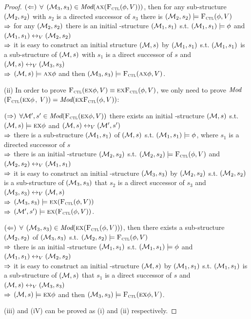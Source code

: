 \documentclass{article}
\begin{document}
\begin{proof}
$(\Leftarrow)$ $\forall$ $({\cal M}_3, s_3) \in \textit{Mod}(\textsc{a} \textsc{x} ({\textsc{F}_{\textsc{ctl}}}(\phi,V)))$, then for any sub-structure $({\cal M}_2, s_2)$ with $s_2$ is a directed successor of $s_3$ there is $({\cal M}_2, s_2) \models {\textsc{F}_{\textsc{ctl}}}(\phi,V)$\\
$\Rightarrow$ for any $({\cal M}_2, s_2)$ there is an initial \MPK-structure $({\cal M}_1, s_1)$ s.t. $({\cal M}_1, s_1) \models \phi$ and $({\cal M}_1, s_1) \leftrightarrow_V ({\cal M}_2, s_2)$\\
$\Rightarrow$ it is easy to construct an initial structure $({\cal M},s)$ by $({\cal M}_1, s_1)$ s.t. $({\cal M}_1, s_1)$ is a sub-structure of $({\cal M}, s)$ with $s_1$ is a direct successor of $s$ and $({\cal M}, s)\leftrightarrow_V ({\cal M}_3, s_3)$\\
$\Rightarrow$ $({\cal M}, s) \models \textsc{a} \textsc{x} \phi$ and then $({\cal M}_3, s_3) \models {\textsc{F}_{\textsc{ctl}}}(\textsc{a} \textsc{x} \phi, V)$.


(ii) In order to prove ${\textsc{F}_{\textsc{ctl}}}(\textsc{e} \textsc{x} \phi, V) \equiv \textsc{e}\textsc{x}{\textsc{F}_{\textsc{ctl}}}(\phi, V)$, we only need to prove $\textit{Mod}$ $({\textsc{F}_{\textsc{ctl}}}(\textsc{e} \textsc{x} \phi$, $V)) = \textit{Mod}( \textsc{e}\textsc{x}{\textsc{F}_{\textsc{ctl}}}(\phi, V))$:

$(\Rightarrow)$ $\forall {\cal M}', s' \in \textit{Mod}({\textsc{F}_{\textsc{ctl}}}(\textsc{e} \textsc{x} \phi, V))$ there exists an initial \MPK-structure $({\cal M}, s)$ s.t. $({\cal M}, s) \models \textsc{e} \textsc{x} \phi$ and $({\cal M}, s) \leftrightarrow_V ({\cal M}',s')$\\
$\Rightarrow$ there is a sub-structure $({\cal M}_1, s_1)$ of $({\cal M}, s)$ s.t. $({\cal M}_1, s_1) \models \phi$, where $s_1$ is a directed successor of $s$\\
$\Rightarrow$ there is an initial \MPK-structure $({\cal M}_2, s_2)$ s.t. $({\cal M}_2, s_2) \models {\textsc{F}_{\textsc{ctl}}}(\phi,V)$ and $({\cal M}_2, s_2) \leftrightarrow_V ({\cal M}_1,s_1)$\\
$\Rightarrow$ it is easy to construct an initial \MPK-structure $({\cal M}_3, s_3)$ by $({\cal M}_2, s_2)$ s.t. $({\cal M}_2, s_2)$ is a sub-structure of $({\cal M}_3, s_3)$ that $s_2$ is a direct successor of $s_3$ and $({\cal M}_3, s_3) \leftrightarrow_V ({\cal M},s)$\\
$\Rightarrow$ $({\cal M}_3, s_3) \models \textsc{e} \textsc{x} ({\textsc{F}_{\textsc{ctl}}}(\phi,V))$\\
$\Rightarrow$ $({\cal M}', s') \models \textsc{e} \textsc{x} ({\textsc{F}_{\textsc{ctl}}}(\phi,V))$.

$(\Leftarrow)$ $\forall$ $({\cal M}_3, s_3) \in \textit{Mod}(\textsc{e} \textsc{x} ({\textsc{F}_{\textsc{ctl}}}(\phi,V)))$, then there exists a sub-structure $({\cal M}_2, s_2)$ of $({\cal M}_3, s_3)$ s.t. $({\cal M}_2, s_2) \models {\textsc{F}_{\textsc{ctl}}}(\phi,V)$\\
$\Rightarrow$ there is an initial \MPK-structure $({\cal M}_1, s_1)$ s.t. $({\cal M}_1, s_1) \models \phi$ and $({\cal M}_1, s_1) \leftrightarrow_V ({\cal M}_2, s_2)$\\
$\Rightarrow$ it is easy to construct an initial \MPK-structure $({\cal M},s)$ by $({\cal M}_1, s_1)$ s.t. $({\cal M}_1, s_1)$ is a sub-structure of $({\cal M}, s)$ that $s_1$ is a direct successor of $s$ and $({\cal M}, s)\leftrightarrow_V ({\cal M}_3, s_3)$\\
$\Rightarrow$ $({\cal M}, s) \models \textsc{e} \textsc{x} \phi$ and then $({\cal M}_3, s_3) \models {\textsc{F}_{\textsc{ctl}}}(\textsc{e} \textsc{x} \phi, V)$.



(iii) and (iV) can be proved as (i) and (ii) respectively.
\end{proof}
\end{document}
